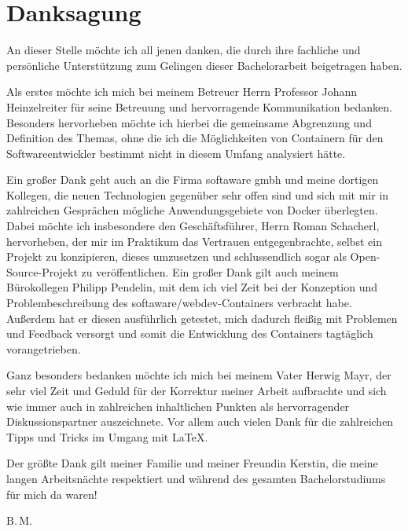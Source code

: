 \chapter*{Danksagung}
An dieser Stelle möchte ich all jenen danken, die durch ihre fachliche und persönliche Unterstützung zum Gelingen dieser Bachelorarbeit beigetragen haben.

Als erstes möchte ich mich bei meinem Betreuer Herrn Professor Johann Heinzelreiter für seine Betreuung und hervorragende Kommunikation bedanken.
Besonders hervorheben möchte ich hierbei die gemeinsame Abgrenzung und Definition des Themas, ohne die ich die Möglichkeiten von Containern für den Softwareentwickler bestimmt nicht in diesem Umfang analysiert hätte.

Ein großer Dank geht auch an die Firma softaware gmbh und meine dortigen Kollegen, die neuen Technologien gegenüber sehr offen sind und sich mit mir in zahlreichen Gesprächen mögliche Anwendungsgebiete von Docker überlegten.
Dabei möchte ich insbesondere den Geschäftsführer, Herrn Roman Schacherl, hervorheben, der mir im Praktikum das Vertrauen entgegenbrachte, selbst ein Projekt zu konzipieren, dieses umzusetzen und schlussendlich sogar als Open-Source-Projekt zu veröffentlichen.
Ein großer Dank gilt auch meinem Bürokollegen Philipp Pendelin, mit dem ich viel Zeit bei der Konzeption und Problembeschreibung des softaware/webdev-Containers verbracht habe.
Außerdem hat er diesen ausführlich getestet, mich dadurch fleißig mit Problemen und Feedback versorgt und somit die Entwicklung des Containers tagtäglich vorangetrieben.

Ganz besonders bedanken möchte ich mich bei meinem Vater Herwig Mayr, der sehr viel Zeit und Geduld für der Korrektur meiner Arbeit aufbrachte und sich wie immer auch in zahlreichen inhaltlichen Punkten als hervorragender Diskussionspartner auszeichnete.
Vor allem auch vielen Dank für die zahlreichen Tipps und Tricks im Umgang mit \LaTeX.

Der größte Dank gilt meiner Familie und meiner Freundin Kerstin, die meine langen Arbeitsnächte respektiert und während des gesamten Bachelorstudiums für mich da waren!

\hfill \break
B.\,M.
